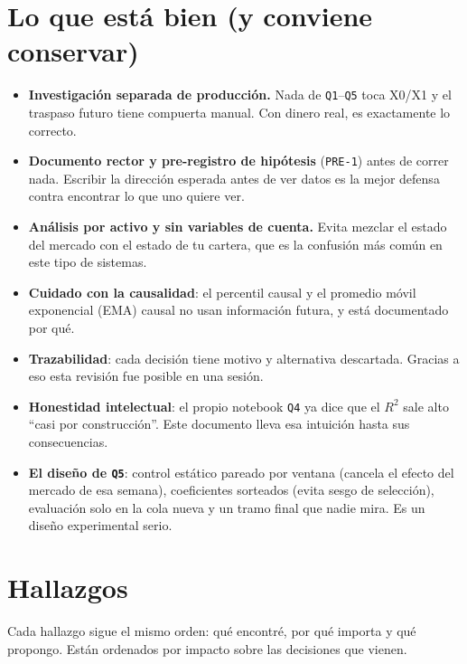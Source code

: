 \documentclass[11pt,a4paper]{article}
\newcommand{\code}[1]{\texttt{\small #1}}
\begin{document}
\section{Lo que está bien (y conviene conservar)}

\begin{itemize}[leftmargin=1.2em]
  \item \textbf{Investigación separada de producción.} Nada de \code{Q1}–\code{Q5} toca X0/X1 y el
        traspaso futuro tiene compuerta manual. Con dinero real, es exactamente lo correcto.
  \item \textbf{Documento rector y pre-registro de hipótesis} (\code{PRE-1}) antes de correr nada.
        Escribir la dirección esperada antes de ver datos es la mejor defensa contra encontrar lo que
        uno quiere ver.
  \item \textbf{Análisis por activo y sin variables de cuenta.} Evita mezclar el estado del mercado
        con el estado de tu cartera, que es la confusión más común en este tipo de sistemas.
  \item \textbf{Cuidado con la causalidad}: el percentil causal y el promedio móvil exponencial (EMA)
        causal no usan información futura, y está documentado por qué.
  \item \textbf{Trazabilidad}: cada decisión tiene motivo y alternativa descartada. Gracias a eso esta
        revisión fue posible en una sesión.
  \item \textbf{Honestidad intelectual}: el propio notebook \code{Q4} ya dice que el $R^2$ sale alto
        ``casi por construcción''. Este documento lleva esa intuición hasta sus consecuencias.
  \item \textbf{El diseño de \code{Q5}}: control estático pareado por ventana (cancela el efecto del
        mercado de esa semana), coeficientes sorteados (evita sesgo de selección), evaluación solo en la
        cola nueva y un tramo final que nadie mira. Es un diseño experimental serio.
\end{itemize}

\section{Hallazgos}

Cada hallazgo sigue el mismo orden: qué encontré, por qué importa y qué propongo. Están ordenados por
impacto sobre las decisiones que vienen.
\end{document}
